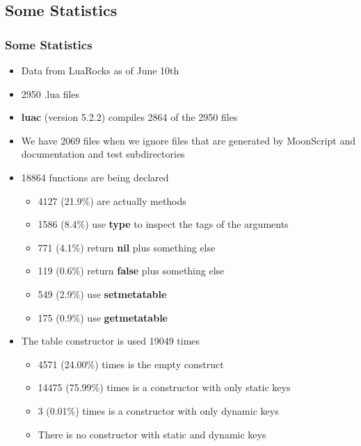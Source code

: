 \documentclass{beamer}
\begin{document}
\subsection{Some Statistics}
\begin{frame}
\frametitle{Some Statistics}
\begin{itemize}
\item Data from LuaRocks as of June 10th
\item 2950 .lua files
\item \textbf{luac} (version 5.2.2) compiles 2864 of the 2950 files
\item We have 2069 files when we ignore files that are generated by
MoonScript and documentation and test subdirectories
\item 18864 functions are being declared
\begin{itemize}
\item 4127 (21.9\%) are actually methods
\item 1586 (8.4\%) use \textbf{type} to inspect the tags of the arguments
\item 771 (4.1\%) return \textbf{nil} plus something else
\item 119 (0.6\%) return \textbf{false} plus something else
\item 549 (2.9\%) use \textbf{setmetatable}
\item 175 (0.9\%) use \textbf{getmetatable}
\end{itemize}
\item The table constructor is used 19049 times
\begin{itemize}
\item 4571 (24.00\%) times is the empty construct
\item 14475 (75.99\%) times is a constructor with only static keys
\item 3 (0.01\%) times is a constructor with only dynamic keys
\item There is no constructor with static and dynamic keys
\end{itemize}
\end{itemize}
\end{frame}
\end{document}
